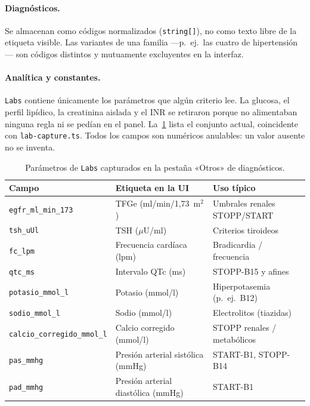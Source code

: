 \paragraph{Diagnósticos.}
Se almacenan como códigos normalizados (\texttt{string[]}), no como texto
libre de la etiqueta visible. Las variantes de una familia ---p.~ej.\ las
cuatro de hipertensión--- son códigos distintos y mutuamente excluyentes en
la interfaz.

\paragraph{Analítica y constantes.}
\texttt{Labs} contiene únicamente los parámetros que algún criterio lee. La
glucosa, el perfil lipídico, la creatinina aislada y el INR se retiraron
porque no alimentaban ninguna regla ni se pedían en el panel. La~\cref{tab:labs}
lista el conjunto actual, coincidente con \texttt{lab-capture.ts}. Todos los
campos son numéricos anulables: un valor ausente no se inventa.

\begin{table}[H]
  \centering
  \scriptsize
  \begin{tabularx}{\textwidth}{@{}p{4.2cm}p{4.8cm}X@{}}
    \toprule
    \textbf{Campo} & \textbf{Etiqueta en la UI} & \textbf{Uso típico} \\
    \midrule
    \texttt{egfr\_ml\_min\_173} & TFGe (ml/min/1,73~m$^2$) & Umbrales renales STOPP/START \\
    \texttt{tsh\_uUl} & TSH ($\mu$U/ml) & Criterios tiroideos \\
    \texttt{fc\_lpm} & Frecuencia cardíaca (lpm) & Bradicardia / frecuencia \\
    \texttt{qtc\_ms} & Intervalo QTc (ms) & STOPP-B15 y afines \\
    \texttt{potasio\_mmol\_l} & Potasio (mmol/l) & Hiperpotasemia (p.~ej.\ B12) \\
    \texttt{sodio\_mmol\_l} & Sodio (mmol/l) & Electrolitos (tiazidas) \\
    \texttt{calcio\_corregido\_mmol\_l} & Calcio corregido (mmol/l) & STOPP renales / metabólicos \\
    \texttt{pas\_mmhg} & Presión arterial sistólica (mmHg) & START-B1, STOPP-B14 \\
    \texttt{pad\_mmhg} & Presión arterial diastólica (mmHg) & START-B1 \\
    \bottomrule
  \end{tabularx}
  \caption{Parámetros de \texttt{Labs} capturados en la pestaña «Otros» de
  diagnósticos.}
  \label{tab:labs}
\end{table}

